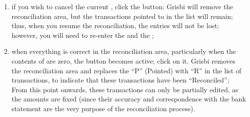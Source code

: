 \begin{enumerate}
\begin{itemize}
	\end{itemize}
	If this is not the case, it means there is an error somewhere in a calculation, a balance or elsewhere;
	\item if you wish to cancel the current , click the  button: Grisbi will remove the reconciliation area, but the transactions pointed to in the list will remain; thus, when you resume the reconciliation, the entries will not be lost; however, you will need to re-enter the  and the ;
	\item when everything is correct in the reconciliation area, particularly when the contents of  are zero, the  button becomes active; click on it. Grisbi removes the reconciliation area and replaces the \enquote{P} (Pointed) with \enquote{R} in the list of transactions, to indicate that these transactions have been \enquote{Reconciled}; From this point onwards, these transactions can only be partially edited, as the amounts are fixed (since their accuracy and correspondence with the bank statement are the very purpose of the reconciliation process).
\end{enumerate}

